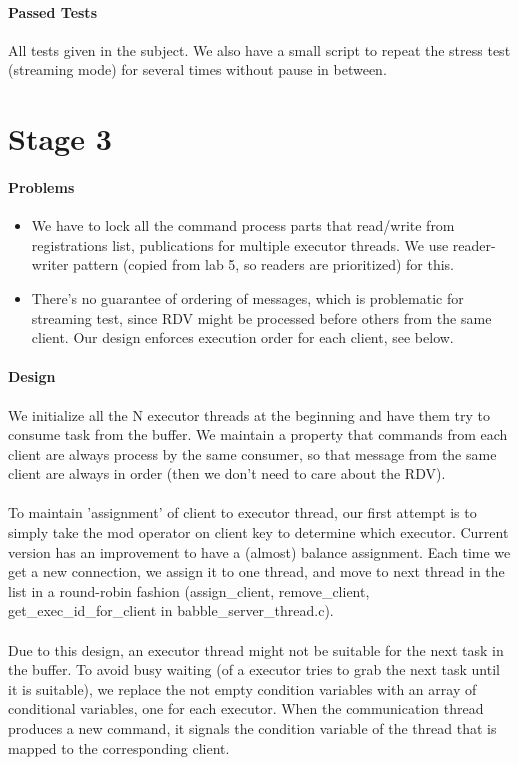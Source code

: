 \documentclass{article}
\begin{document}
\paragraph{Passed Tests} All tests given in the subject. We also have a small script to repeat the stress test (streaming mode) for several times without pause in between.

\section{Stage 3}
\paragraph{Problems}
\begin{itemize}
\item We have to lock all the command process parts that read/write from registrations list, publications
for multiple executor threads. We use reader-writer pattern (copied from lab 5, so readers are prioritized) for this.
\item There's no guarantee of ordering of messages, which is problematic for streaming test, since RDV might be processed before others from the same client. Our design enforces execution order for each client, see below.
\end{itemize}

\paragraph{Design} We initialize all the N executor threads at the beginning and have them try to consume task from the buffer. We maintain a property that commands from each client are always process by the same consumer, so that message from the same client are always in order (then we don't need to care about the RDV).
\paragraph{} To maintain 'assignment' of client to executor thread, our first attempt is to simply take the mod operator on client key to determine which executor. Current version has an improvement to have a (almost) balance assignment. Each time we get a new connection, we assign it to one thread, and move to next thread in the list in a round-robin fashion (assign\_client, remove\_client, get\_exec\_id\_for\_client in babble\_server\_thread.c).
\paragraph{} Due to this design, an executor thread might not be suitable for the next task in the buffer. To avoid busy waiting (of a executor tries to grab the next task until it is suitable), we replace the not empty condition variables with an array of conditional variables, one for each executor. When the communication thread produces a new command, it signals the condition variable of the thread that is mapped to the corresponding client.
\end{document}
